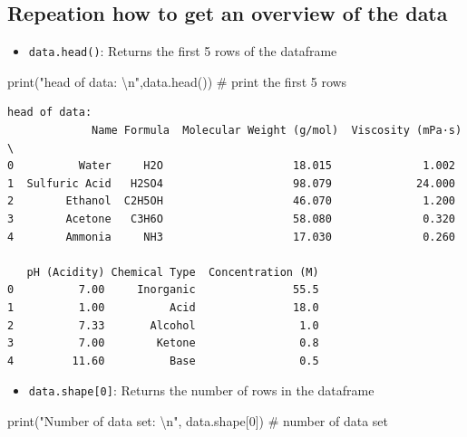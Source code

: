 \documentclass[
  letterpaper,
  DIV=11,
  numbers=noendperiod]{scrreprt}
\newenvironment{Shaded}{\begin{snugshade}}{\end{snugshade}}
\newcommand{\BuiltInTok}[1]{\textcolor[rgb]{0.00,0.23,0.31}{#1}}
\newcommand{\CharTok}[1]{\textcolor[rgb]{0.13,0.47,0.30}{#1}}
\newcommand{\CommentTok}[1]{\textcolor[rgb]{0.37,0.37,0.37}{#1}}
\newcommand{\DecValTok}[1]{\textcolor[rgb]{0.68,0.00,0.00}{#1}}
\newcommand{\NormalTok}[1]{\textcolor[rgb]{0.00,0.23,0.31}{#1}}
\newcommand{\StringTok}[1]{\textcolor[rgb]{0.13,0.47,0.30}{#1}}
\providecommand{\tightlist}{%
  \setlength{\itemsep}{0pt}\setlength{\parskip}{0pt}}\usepackage{longtable,booktabs,array}
\begin{document}
\subsection*{Repeation how to get an overview of the
data}\label{repeation-how-to-get-an-overview-of-the-data}

\begin{itemize}
\tightlist
\item
  \texttt{data.head()}: Returns the first 5 rows of the dataframe
\end{itemize}

\begin{Shaded}
\begin{Highlighting}[]
\BuiltInTok{print}\NormalTok{(}\StringTok{"head of data: }\CharTok{\textbackslash{}n}\StringTok{"}\NormalTok{,data.head()) }\CommentTok{\# print the first 5 rows}
\end{Highlighting}
\end{Shaded}

\begin{verbatim}
head of data: 
             Name Formula  Molecular Weight (g/mol)  Viscosity (mPa·s)  \
0          Water     H2O                    18.015              1.002   
1  Sulfuric Acid   H2SO4                    98.079             24.000   
2        Ethanol  C2H5OH                    46.070              1.200   
3        Acetone   C3H6O                    58.080              0.320   
4        Ammonia     NH3                    17.030              0.260   

   pH (Acidity) Chemical Type  Concentration (M)  
0          7.00     Inorganic               55.5  
1          1.00          Acid               18.0  
2          7.33       Alcohol                1.0  
3          7.00        Ketone                0.8  
4         11.60          Base                0.5  
\end{verbatim}

\begin{itemize}
\tightlist
\item
  \texttt{data.shape{[}0{]}}: Returns the number of rows in the
  dataframe
\end{itemize}

\begin{Shaded}
\begin{Highlighting}[]
\BuiltInTok{print}\NormalTok{(}\StringTok{"Number of data set: }\CharTok{\textbackslash{}n}\StringTok{"}\NormalTok{, data.shape[}\DecValTok{0}\NormalTok{]) }\CommentTok{\# number of data set}
\end{Highlighting}
\end{Shaded}
\end{document}
